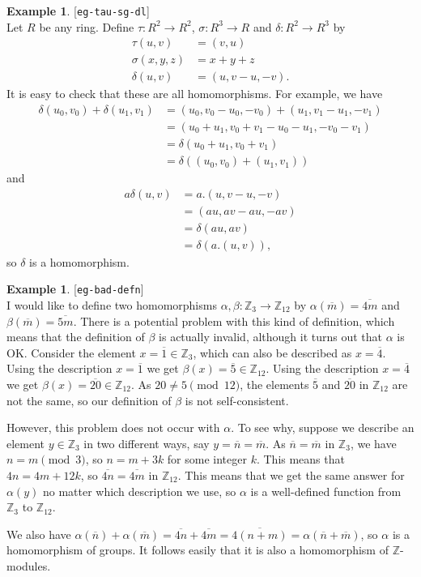 \documentclass{amsart}
\newcommand{\lbl}[1]{\label{#1}\textup{[\texttt{#1}]}\ \\}
\newcommand{\lbl}{\label}
\newcommand{\Z}         {{\mathbb{Z}}}
\newcommand{\al}        {\alpha}
\newcommand{\bt}        {\beta}
\newcommand{\dl}        {\delta}
\newcommand{\sg}        {\sigma}
\newcommand{\ov}[1]     {\overline{#1}}
\newcommand{\xra}       {\xrightarrow}
\renewcommand{\:}{\colon}
\theoremstyle{definition}
\newtheorem{example}[theorem]{Example}
\begin{document}
\begin{example}\lbl{eg-tau-sg-dl}
 Let $R$ be any ring.  Define $\tau\:R^2\xra{}R^2$, $\sg\:R^3\xra{}R$
 and $\dl\:R^2\xra{}R^3$ by
 \begin{align*}
  \tau(u,v) &= (v,u) \\
  \sg(x,y,z) &= x+y+z \\
  \dl(u,v) &= (u,v-u,-v).
 \end{align*}
 It is easy to check that these are all homomorphisms.  For example,
 we have
 \begin{align*}
  \dl(u_0,v_0) + \dl(u_1,v_1) &= 
   (u_0,v_0-u_0,-v_0) + (u_1,v_1-u_1,-v_1) \\
   &= (u_0+u_1,v_0+v_1 - u_0 - u_1, -v_0-v_1) \\
   &= \dl(u_0+u_1,v_0+v_1) \\
   &= \dl((u_0,v_0) + (u_1,v_1))
 \end{align*}
 and
 \begin{align*}
  a \dl(u,v) &= a.(u,v-u,-v) \\
             &= (au,av-au,-av) \\
             &= \dl(au,av) \\
             &= \dl(a.(u,v)),
 \end{align*}
 so $\dl$ is a homomorphism.
\end{example}
\begin{example}\lbl{eg-bad-defn}
 I would like to define two homomorphisms $\al,\bt\:\Z_3\xra{}\Z_{12}$
 by $\al(\ov{m})=\ov{4m}$ and $\bt(\ov{m})=\ov{5m}$.  There is a
 potential problem with this kind of definition, which means that the
 definition of $\bt$ is actually invalid, although it turns out that
 $\al$ is OK.  Consider the element $x=\ov{1}\in\Z_3$, which can also
 be described as $x=\ov{4}$.  Using the description $x=\ov{1}$ we get
 $\bt(x)=\ov{5}\in\Z_{12}$.  Using the description $x=\ov{4}$ we get
 $\bt(x)=\ov{20}\in\Z_{12}$.  As $20\neq 5\pmod{12}$, the elements
 $\ov{5}$ and $\ov{20}$ in $\Z_{12}$ are not the same, so our
 definition of $\bt$ is not self-consistent.

 However, this problem does not occur with $\al$.  To see why, suppose
 we describe an element $y\in\Z_3$ in two different ways, say
 $y=\ov{n}=\ov{m}$.  As $\ov{n}=\ov{m}$ in $\Z_3$, we have
 $n=m\pmod{3}$, so $n=m+3k$ for some integer $k$.  This means that
 $4n=4m+12k$, so $\ov{4n}=\ov{4m}$ in $\Z_{12}$.  This means that we
 get the same answer for $\al(y)$ no matter which description we use,
 so $\al$ is a well-defined function from $\Z_3$ to $\Z_{12}$.  

 We also have
 $\al(\ov{n})+\al(\ov{m})=\ov{4n}+\ov{4m}=\ov{4(n+m)}=\al(\ov{n}+\ov{m})$,
 so $\al$ is a homomorphism of groups.  It follows easily that it is
 also a homomorphism of $\Z$-modules.
\end{example}
\end{document}

